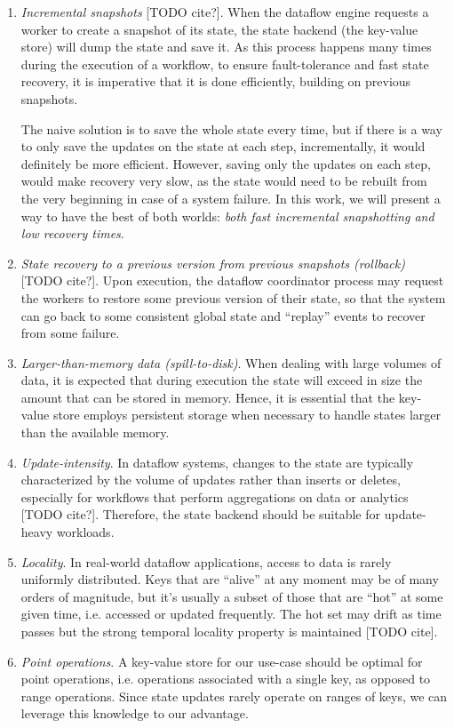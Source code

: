 \begin{enumerate}
    \item \textit{Incremental snapshots} [TODO cite?].
    When the dataflow engine requests a worker to create a snapshot of its state, the state backend (the key-value store) will dump the state and save it. As this process happens many times during the execution of a workflow, to ensure fault-tolerance and fast state recovery, it is imperative that it is done efficiently, building on previous snapshots.
    
    The naive solution is to save the whole state every time, but if there is a way to only save the updates on the state at each step, incrementally, it would definitely be more efficient. However, saving only the updates on each step, would make recovery very slow, as the state would need to be rebuilt from the very beginning in case of a system failure.
    In this work, we will present a way to have the best of both worlds: \textit{both fast incremental snapshotting and low recovery times}.

    \item \textit{State recovery to a previous version from previous snapshots (rollback)} [TODO cite?]. Upon execution, the dataflow coordinator process may request the workers to restore some previous version of their state, so that the system can go back to some consistent global state and ``replay'' events to recover from some failure.
    
    \item \textit{Larger-than-memory data (spill-to-disk)}.
    When dealing with large volumes of data, it is expected that during execution the state will exceed in size the amount that can be stored in memory.
    Hence, it is essential that the key-value store employs persistent storage when necessary to handle states larger than the available memory.

    \item \textit{Update-intensity}.
    In dataflow systems, changes to the state are typically characterized by the volume of updates rather than inserts or deletes, especially for workflows that perform aggregations on data or analytics [TODO cite?]. Therefore, the state backend should be suitable for update-heavy workloads.

    \item \textit{Locality}.
    In real-world dataflow applications, access to data is rarely uniformly distributed.
    Keys that are ``alive'' at any moment may be of many orders of magnitude, but it's usually a subset of those that are ``hot'' at some given time, i.e. accessed or updated frequently.
    The hot set may drift as time passes but the strong temporal locality property is maintained [TODO cite].

    \item \textit{Point operations}.
    A key-value store for our use-case should be optimal for point operations, i.e. operations associated with a single key, as opposed to range operations.
    Since state updates rarely operate on ranges of keys, we can leverage this knowledge to our advantage.

\end{enumerate}

